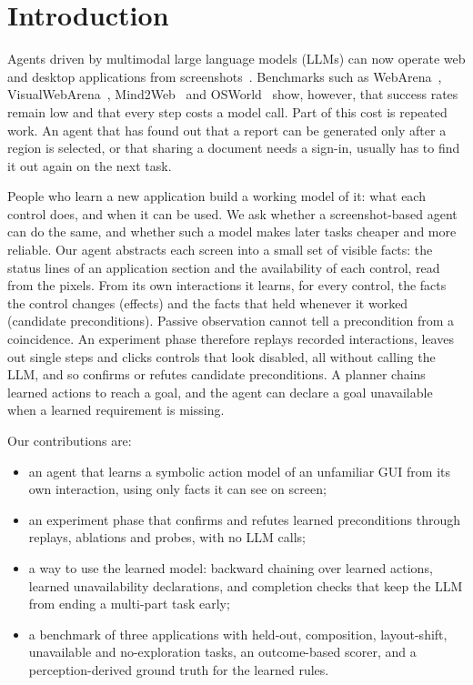 \documentclass[conference]{IEEEtran}
\begin{document}
\section{Introduction}
Agents driven by multimodal large language models (LLMs) can now operate web and desktop applications from screenshots~\cite{zheng2024seeact,hong2024cogagent,cheng2024seeclick,lu2024omniparser}. Benchmarks such as WebArena~\cite{zhou2024webarena}, VisualWebArena~\cite{koh2024visualwebarena}, Mind2Web~\cite{deng2023mind2web} and OSWorld~\cite{xie2024osworld} show, however, that success rates remain low and that every step costs a model call. Part of this cost is repeated work. An agent that has found out that a report can be generated only after a region is selected, or that sharing a document needs a sign-in, usually has to find it out again on the next task.

People who learn a new application build a working model of it: what each control does, and when it can be used. We ask whether a screenshot-based agent can do the same, and whether such a model makes later tasks cheaper and more reliable. Our agent abstracts each screen into a small set of visible facts: the status lines of an application section and the availability of each control, read from the pixels. From its own interactions it learns, for every control, the facts the control changes (effects) and the facts that held whenever it worked (candidate preconditions). Passive observation cannot tell a precondition from a coincidence. An experiment phase therefore replays recorded interactions, leaves out single steps and clicks controls that look disabled, all without calling the LLM, and so confirms or refutes candidate preconditions. A planner chains learned actions to reach a goal, and the agent can declare a goal unavailable when a learned requirement is missing.

Our contributions are:
\begin{itemize}
\item an agent that learns a symbolic action model of an unfamiliar GUI from its own interaction, using only facts it can see on screen;
\item an experiment phase that confirms and refutes learned preconditions through replays, ablations and probes, with no LLM calls;
\item a way to use the learned model: backward chaining over learned actions, learned unavailability declarations, and completion checks that keep the LLM from ending a multi-part task early;
\item a benchmark of three applications with held-out, composition, layout-shift, unavailable and no-exploration tasks, an outcome-based scorer, and a perception-derived ground truth for the learned rules.
\end{itemize}
\end{document}

